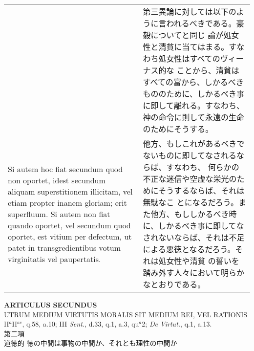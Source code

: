 \documentclass[10pt]{jsarticle}
\begin{document}
\begin{longtable}{p{21em}p{21em}}
&

 第三異論に対しては以下のように言われるべきである。豪毅についてと同じ
 論が処女性と清貧に当てはまる。すなわち処女性はすべてのヴィーナス的な
 ことから、清貧はすべての富から、しかるべきもののために、しかるべき事
 に即して離れる。すなわち、神の命令に則して永遠の生命のためにそうする。

\\

 Si autem hoc fiat secundum quod non oportet, idest secundum aliquam
 superstitionem illicitam, vel etiam propter inanem gloriam; erit
 superfluum. Si autem non fiat quando oportet, vel secundum quod
 oportet, est vitium per defectum, ut patet in transgredientibus votum
 virginitatis vel paupertatis.

&

 他方、もしこれがあるべきでないものに即してなされるならば、すなわち、
 何らかの不正な迷信や空虚な栄光のためにそうするならば、それは無駄なこ
 とになるだろう。また他方、もししかるべき時に、しかるべき事に即してな
 されないならば、それは不足による悪徳となるだろう。それは処女性や清貧
 の誓いを踏み外す人々において明らかなとおりである。


\end{longtable}


\newpage

\begin{center}
{\Large {\bf ARTICULUS SECUNDUS}}\\ {\large UTRUM MEDIUM VIRTUTIS
MORALIS SIT MEDIUM REI, VEL RATIONIS}\\{\footnotesize
II$^{a}$II$^{ae}$, q.58, a.10; III {\itshape Sent.}, d.33, q.1, a.3,
qu$^{a}$2; {\itshape De Virtut.}, q.1, a.13.}\\ {\Large 第二項\\道徳的
徳の中間は事物の中間か、それとも理性の中間か}
\end{center}
\end{document}
